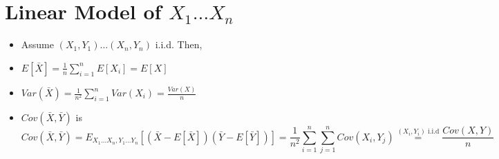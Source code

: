 \documentclass{article}
\begin{document}
\section{Linear Model of $X_1 \dots X_n$}
\begin{itemize}
    \item Assume $(X_1, Y_1) \dots (X_n, Y_n)$ i.i.d. Then,
    \item $E[\bar{X}] = \frac{1}{n}\sum_{i = 1}^{n}E[X_i] = E[X]$
    \item $Var(\bar{X}) = \frac{1}{n^2}\sum_{i = 1}^n Var(X_i) = \frac{Var(X)}{n}$
    \item $Cov(\bar{X}, \bar{Y})$ is
    \[ Cov(\bar{X}, \bar{Y}) = E_{X_1 \dots X_n, Y_1 \dots Y_n}[(\bar{X} - E[\bar{X}])(\bar{Y} - E[\bar{Y}])] = \frac{1}{n^2}\sum_{i = 1}^n\sum_{j = 1}^{n}Cov(X_i, Y_j) \overset{(X_i,Y_i) \text{ i.i.d}}{=}\frac{Cov(X,Y)}{n}
    \]
\end{itemize}
\end{document}
